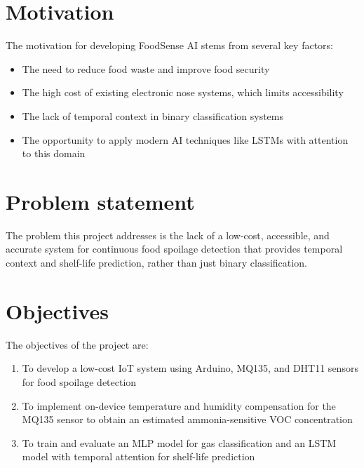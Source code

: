 \section[Motivation]{\textbf{Motivation}}
The motivation for developing FoodSense AI stems from several key factors:
\begin{itemize}
    \item The need to reduce food waste and improve food security
    \item The high cost of existing electronic nose systems, which limits accessibility
    \item The lack of temporal context in binary classification systems
    \item The opportunity to apply modern AI techniques like LSTMs with attention to this domain
\end{itemize}

\section[Problem statement]{\textbf{Problem statement}}
The problem this project addresses is the lack of a low-cost, accessible, and accurate system for continuous food spoilage detection that provides temporal context and shelf-life prediction, rather than just binary classification.

\section[Objectives]{\textbf{Objectives}}
The objectives of the project are:
\begin{enumerate}
    \item To develop a low-cost IoT system using Arduino, MQ135, and DHT11 sensors for food spoilage detection
    \item To implement on-device temperature and humidity compensation for the MQ135 sensor to obtain an estimated ammonia-sensitive VOC concentration
    \item To train and evaluate an MLP model for gas classification and an LSTM model with temporal attention for shelf-life prediction
\end{enumerate}

